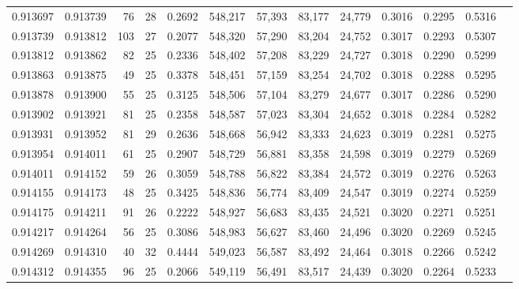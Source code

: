\begin{tabular}{rrrrrrrrrrrrr}
0.913697 & 0.913739 &    76 &  28 &                                     0.2692 & 548,217 &  57,393 &  83,177 &  24,779 & 0.3016 & 0.2295 & 0.5316 \\
0.913739 & 0.913812 &   103 &  27 &                                     0.2077 & 548,320 &  57,290 &  83,204 &  24,752 & 0.3017 & 0.2293 & 0.5307 \\
0.913812 & 0.913862 &    82 &  25 &                                     0.2336 & 548,402 &  57,208 &  83,229 &  24,727 & 0.3018 & 0.2290 & 0.5299 \\
0.913863 & 0.913875 &    49 &  25 &                                     0.3378 & 548,451 &  57,159 &  83,254 &  24,702 & 0.3018 & 0.2288 & 0.5295 \\
0.913878 & 0.913900 &    55 &  25 &                                     0.3125 & 548,506 &  57,104 &  83,279 &  24,677 & 0.3017 & 0.2286 & 0.5290 \\
0.913902 & 0.913921 &    81 &  25 &                                     0.2358 & 548,587 &  57,023 &  83,304 &  24,652 & 0.3018 & 0.2284 & 0.5282 \\
0.913931 & 0.913952 &    81 &  29 &                                     0.2636 & 548,668 &  56,942 &  83,333 &  24,623 & 0.3019 & 0.2281 & 0.5275 \\
0.913954 & 0.914011 &    61 &  25 &                                     0.2907 & 548,729 &  56,881 &  83,358 &  24,598 & 0.3019 & 0.2279 & 0.5269 \\
0.914011 & 0.914152 &    59 &  26 &                                     0.3059 & 548,788 &  56,822 &  83,384 &  24,572 & 0.3019 & 0.2276 & 0.5263 \\
0.914155 & 0.914173 &    48 &  25 &                                     0.3425 & 548,836 &  56,774 &  83,409 &  24,547 & 0.3019 & 0.2274 & 0.5259 \\
0.914175 & 0.914211 &    91 &  26 &                                     0.2222 & 548,927 &  56,683 &  83,435 &  24,521 & 0.3020 & 0.2271 & 0.5251 \\
0.914217 & 0.914264 &    56 &  25 &                                     0.3086 & 548,983 &  56,627 &  83,460 &  24,496 & 0.3020 & 0.2269 & 0.5245 \\
0.914269 & 0.914310 &    40 &  32 &                                     0.4444 & 549,023 &  56,587 &  83,492 &  24,464 & 0.3018 & 0.2266 & 0.5242 \\
0.914312 & 0.914355 &    96 &  25 &                                     0.2066 & 549,119 &  56,491 &  83,517 &  24,439 & 0.3020 & 0.2264 & 0.5233 \\

\end{tabular}
